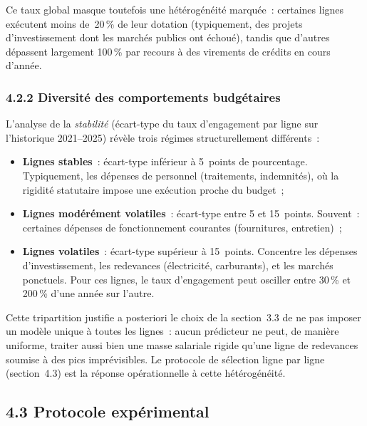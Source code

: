 Ce taux global masque toutefois une h\'et\'erog\'en\'eit\'e marqu\'ee~: certaines
lignes ex\'ecutent moins de~20\,\% de leur dotation (typiquement, des projets
d'investissement dont les march\'es publics ont \'echou\'e), tandis que d'autres
d\'epassent largement 100\,\% par recours \`a des virements de cr\'edits en
cours d'ann\'ee.

\subsubsection*{4.2.2 \quad Diversit\'e des comportements budg\'etaires}

L'analyse de la \emph{stabilit\'e} (\'ecart-type du taux d'engagement par ligne
sur l'historique 2021--2025) r\'ev\`ele trois r\'egimes structurellement
diff\'erents~:

\begin{itemize}
    \item \textbf{Lignes stables}~: \'ecart-type inf\'erieur \`a 5~points de
    pourcentage. Typiquement, les d\'epenses de personnel (traitements,
    indemnit\'es), o\`u la rigidit\'e statutaire impose une ex\'ecution proche
    du budget~;
    \item \textbf{Lignes mod\'er\'ement volatiles}~: \'ecart-type entre 5 et
    15~points. Souvent~: certaines d\'epenses de fonctionnement courantes
    (fournitures, entretien)~;
    \item \textbf{Lignes volatiles}~: \'ecart-type sup\'erieur \`a 15~points.
    Concentre les d\'epenses d'investissement, les redevances (\'electricit\'e,
    carburants), et les march\'es ponctuels. Pour ces lignes, le taux
    d'engagement peut osciller entre 30\,\% et 200\,\% d'une ann\'ee sur
    l'autre.
\end{itemize}

Cette tripartition justifie a posteriori le choix de la section~3.3 de ne pas
imposer un mod\`ele unique \`a toutes les lignes~: aucun pr\'edicteur ne peut,
de mani\`ere uniforme, traiter aussi bien une masse salariale rigide qu'une
ligne de redevances soumise \`a des pics impr\'evisibles. Le protocole de
s\'election ligne par ligne (section~4.3) est la r\'eponse op\'erationnelle
\`a cette h\'et\'erog\'en\'eit\'e.

\subsection*{4.3 \quad Protocole exp\'erimental}

